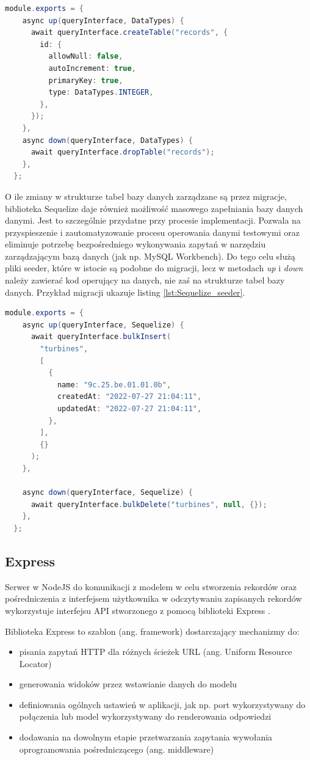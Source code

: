 \documentclass{sprz}
\begin{document}
\begin{lstlisting}[language=Java,caption={Przykład pliku migracji}, label={lst:Sequelize_migration}]
  module.exports = {
    async up(queryInterface, DataTypes) {
      await queryInterface.createTable("records", {
        id: {
          allowNull: false,
          autoIncrement: true,
          primaryKey: true,
          type: DataTypes.INTEGER,
        },
      });
    },
    async down(queryInterface, DataTypes) {
      await queryInterface.dropTable("records");
    },
  };
\end{lstlisting}

O ile zmiany w strukturze tabel bazy danych zarządzane są przez migracje, biblioteka Sequelize daje również możliwość masowego zapełniania bazy danych danymi. Jest to szczególnie przydatne przy procesie implementacji. Pozwala na przyspieszenie i zautomatyzowanie procesu operowania danymi testowymi oraz eliminuje potrzebę bezpośredniego wykonywania zapytań w narzędziu zarządzającym bazą danych (jak np. MySQL Workbench). Do tego celu służą pliki seeder, które w istocie są podobne do migracji, lecz w metodach \textit{up} i \textit{down} należy zawierać kod operujący na danych, nie zaś na strukturze tabel bazy danych. Przykład migracji ukazuje listing \ref{lst:Sequelize_seeder}.

\begin{lstlisting}[language=Java,caption={Przykład pliku seeder}, label={lst:Sequelize_seeder}]
  module.exports = {
    async up(queryInterface, Sequelize) {
      await queryInterface.bulkInsert(
        "turbines",
        [
          {
            name: "9c.25.be.01.01.0b",
            createdAt: "2022-07-27 21:04:11",
            updatedAt: "2022-07-27 21:04:11",
          },
        ],
        {}
      );
    },
  
    async down(queryInterface, Sequelize) {
      await queryInterface.bulkDelete("turbines", null, {});
    },
  };
\end{lstlisting}

\subsection{Express}

Serwer w NodeJS do komunikacji z modelem w celu stworzenia rekordów oraz pośredniczenia z interfejsem użytkownika w odczytywaniu zapisanych rekordów wykorzystuje interfejsu API stworzonego z pomocą biblioteki Express \cite{express}.

Biblioteka Express to szablon (ang. framework) dostarczający mechanizmy do:
\begin{itemize}
  \item pisania zapytań HTTP dla różnych ścieżek URL (ang. Uniform Resource Locator)
  \item generowania widoków przez wstawianie danych do modelu
  \item definiowania ogólnych ustawień w aplikacji, jak np. port wykorzystywany do połączenia lub model wykorzystywany do renderowania odpowiedzi
  \item dodawania na dowolnym etapie przetwarzania zapytania wywołania oprogramowania pośredniczącego (ang. middleware)
\end{itemize}
\end{document}
